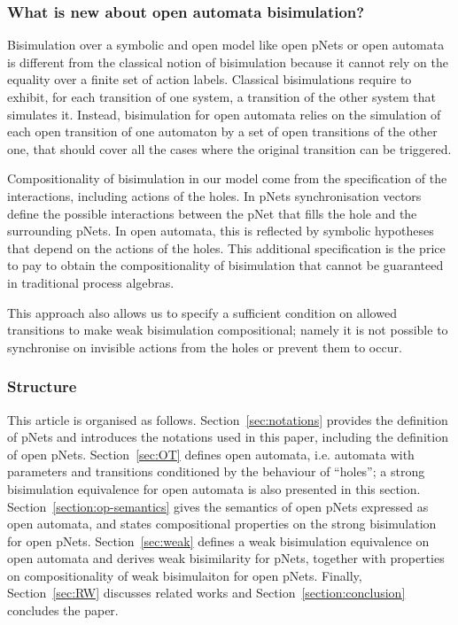 \documentclass{lmcs}
\begin{document}
\subsubsection*{What is new about open automata bisimulation?}

Bisimulation over a symbolic and open model like open pNets or open automata is  different from the classical notion of bisimulation because it cannot rely on the equality over a finite set of action labels. Classical bisimulations require to exhibit, for each transition of one system, a transition of the other system that simulates it. Instead, bisimulation for open automata  relies on the simulation of each open transition of one automaton by a set of open transitions of the other one, that should cover all the 
cases where the original transition can be triggered.

Compositionality of bisimulation in our model come from the specification of the interactions, including actions of the holes. In pNets synchronisation vectors define the possible interactions between the pNet that fills the hole and the surrounding pNets. In open automata, this is reflected by symbolic hypotheses that depend on the actions of the holes. This additional specification is the price to pay to obtain the compositionality of bisimulation that cannot be guaranteed in traditional process algebras. 

This approach also allows us to specify a sufficient condition on allowed transitions to make weak bisimulation compositional; namely it is not possible to synchronise on invisible actions from the holes or prevent them to occur.


\subsubsection*{Structure}
This article is organised as follows. Section~\ref{sec:notations}
provides the definition of pNets and introduces the notations used in
this paper, including the definition of open pNets. 
Section~\ref{sec:OT} defines open automata, i.e. automata
with parameters and transitions conditioned by the behaviour of
``holes''; a strong bisimulation equivalence for open automata is also
presented in this section. 
Section~\ref{section:op-semantics} gives
the semantics of open pNets expressed as open automata, and states
compositional properties on the strong bisimulation for open
pNets. 
Section~\ref{sec:weak} defines a weak bisimulation
equivalence on open automata and derives weak bisimilarity for pNets,
together with properties on compositionality of weak bisimulaiton for
open pNets. 
Finally, Section~\ref{sec:RW} discusses related works and Section~\ref{section:conclusion} concludes the
paper. 
\end{document}
